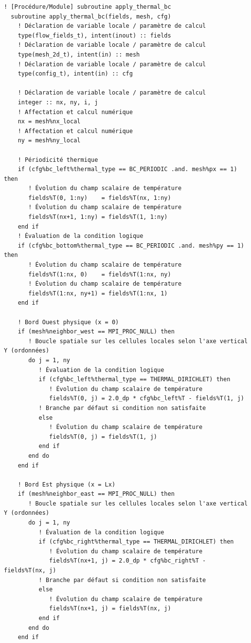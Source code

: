 \documentclass[10pt,a4paper,oneside]{book}
\begin{document}
\begin{lstlisting}[language={[95]Fortran}]
  ! [Procédure/Module] subroutine apply_thermal_bc
  subroutine apply_thermal_bc(fields, mesh, cfg)
    ! Déclaration de variable locale / paramètre de calcul
    type(flow_fields_t), intent(inout) :: fields
    ! Déclaration de variable locale / paramètre de calcul
    type(mesh_2d_t), intent(in) :: mesh
    ! Déclaration de variable locale / paramètre de calcul
    type(config_t), intent(in) :: cfg

    ! Déclaration de variable locale / paramètre de calcul
    integer :: nx, ny, i, j
    ! Affectation et calcul numérique
    nx = mesh%nx_local
    ! Affectation et calcul numérique
    ny = mesh%ny_local

    ! Périodicité thermique
    if (cfg%bc_left%thermal_type == BC_PERIODIC .and. mesh%px == 1) then
       ! Évolution du champ scalaire de température
       fields%T(0, 1:ny)    = fields%T(nx, 1:ny)
       ! Évolution du champ scalaire de température
       fields%T(nx+1, 1:ny) = fields%T(1, 1:ny)
    end if
    ! Évaluation de la condition logique
    if (cfg%bc_bottom%thermal_type == BC_PERIODIC .and. mesh%py == 1) then
       ! Évolution du champ scalaire de température
       fields%T(1:nx, 0)    = fields%T(1:nx, ny)
       ! Évolution du champ scalaire de température
       fields%T(1:nx, ny+1) = fields%T(1:nx, 1)
    end if

    ! Bord Ouest physique (x = 0)
    if (mesh%neighbor_west == MPI_PROC_NULL) then
       ! Boucle spatiale sur les cellules locales selon l'axe vertical Y (ordonnées)
       do j = 1, ny
          ! Évaluation de la condition logique
          if (cfg%bc_left%thermal_type == THERMAL_DIRICHLET) then
             ! Évolution du champ scalaire de température
             fields%T(0, j) = 2.0_dp * cfg%bc_left%T - fields%T(1, j)
          ! Branche par défaut si condition non satisfaite
          else
             ! Évolution du champ scalaire de température
             fields%T(0, j) = fields%T(1, j)
          end if
       end do
    end if

    ! Bord Est physique (x = Lx)
    if (mesh%neighbor_east == MPI_PROC_NULL) then
       ! Boucle spatiale sur les cellules locales selon l'axe vertical Y (ordonnées)
       do j = 1, ny
          ! Évaluation de la condition logique
          if (cfg%bc_right%thermal_type == THERMAL_DIRICHLET) then
             ! Évolution du champ scalaire de température
             fields%T(nx+1, j) = 2.0_dp * cfg%bc_right%T - fields%T(nx, j)
          ! Branche par défaut si condition non satisfaite
          else
             ! Évolution du champ scalaire de température
             fields%T(nx+1, j) = fields%T(nx, j)
          end if
       end do
    end if


\end{lstlisting}
\end{document}
